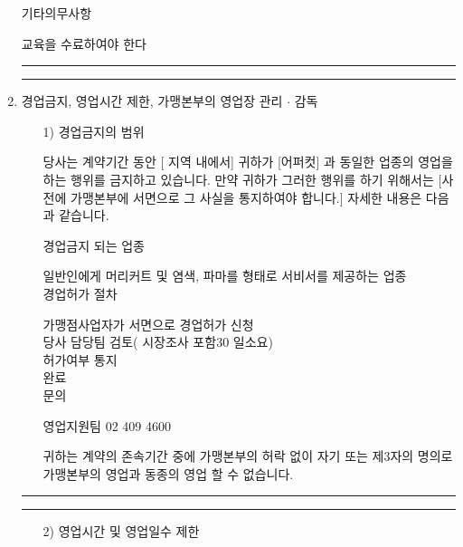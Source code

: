 \documentclass[a5paper,10pt]{oblivoir}
\newcommand\crule[3][black]{\textcolor{#1}{\rule{#2}{#3}}}
\begin{document}
\begin{enumerate}
\begin{tiny}
\begin{Form}
 기타의무사항

\noindent\dotfill 
 교육을 수료하여야 한다
\end{Form}
\end{tiny}

\newpage
\begin{center}
\crule[red]{4cm}{0.1cm} \crule[blue]{4cm}{0.1cm}
\end{center}
\item 경업금지, 영업시간 제한, 가맹본부의 영업장 관리 $\cdot$ 감독
\begin{enumerate}
\item[1)] 경업금지의 범위

당사는 계약기간 동안 [    지역 내에서] 귀하가 [어퍼컷] 과 동일한 업종의 영업을 하는 행위를 금지하고 있습니다. 만약 귀하가 그러한 행위를 하기 위해서는 [사전에 가맹본부에 서면으로 그 사실을 통지하여야 합니다.] 자세한 내용은 다음과 같습니다.

\rule{0cm}{0.5cm}

\begin{tiny}
\begin{Form}
\def\LayoutCheckField#1#2{%
  \parbox[c][5mm]{5mm}{\centering\footnotesize\strut #1\\#2}%
}
\def\LayoutCheckField#1#2{%
  \makebox[0pt][l]{%
    \makebox[5mm][c]{\footnotesize\strut #1}%
  }%
  #2%
}
\def\DefaultHeightofCheckBox{5mm}
\def\DefaultWidthofCheckBox{5mm}


 경업금지 되는 업종

\noindent\dotfill 
 일반인에게 머리커트 및 염색, 파마를 형태로  서비서를 제공하는 업종
\\

 경업허가 절차

\noindent\dotfill 
 가맹점사업자가 서면으로 경업허가 신청\\

\noindent\dotfill 
 당사 담당팀 검토( 시장조사 포함30 일소요)\\

\noindent\dotfill 
 허가여부 통지\\

\noindent\dotfill 
 완료
\\

 문의

\noindent\dotfill 
 영업지원팀 02 409 4600

\end{Form}
\end{tiny}
귀하는 계약의 존속기간 중에 가맹본부의 허락 없이 자기 또는 제3자의 명의로 가맹본부의 영업과 동종의 영업 할 수 없습니다.
\end{enumerate}
\newpage
\begin{center}
\crule[red]{4cm}{0.1cm} \crule[blue]{4cm}{0.1cm}
\end{center}
\begin{enumerate}
\item[2)]
 영업시간 및 영업일수 제한



\end{enumerate}
\end{enumerate}
\end{document}
